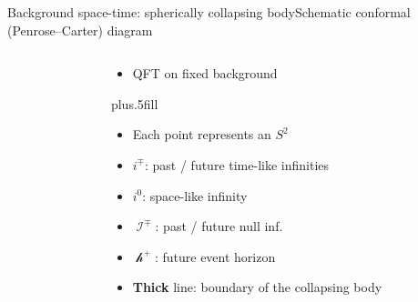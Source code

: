 \documentclass{beamer}
\begin{document}
\begin{frame}{Background space-time: spherically collapsing body}{Schematic 
conformal (Penrose--Carter) diagram}
\begin{columns}

\begin{column}{.45\linewidth}

{\begin{center}

\end{center}}

\end{column}

\begin{column}{.5\linewidth}
\begin{itemize}
\item QFT on fixed background
\end{itemize}
\vskip0pt plus.5fill
\begin{itemize}
\item Each point represents an \alert{$S^2$}
\item $i^\mp$: past / future time-like infinities
\item $i^0$: space-like infinity
\item $\mscrI^\mp$: past / future null inf.\
\item $\mscrh^+$: future event horizon
\item \textbf{Thick} line: \alert{boundary} of the collapsing body
 
\end{itemize}

\end{column}

\end{columns}

\end{frame}
\end{document}
